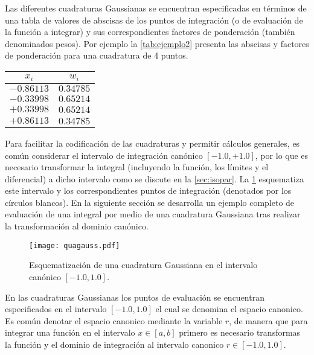 Las diferentes cuadraturas Gaussianas se encuentran especificadas en 
términos de una tabla de valores de abscisas de los puntos de integración (o de 
evaluación de la función a integrar) y sus correspondientes factores de 
ponderación (también denominados pesos). Por ejemplo la \cref{tab:ejemplo2} 
presenta las abscisas y factores de ponderación para una cuadratura de 4 puntos.
\begin{center}
\begin{tabular}{cc}
  \hline
  $x_i$ & $w_i$ \\
  \hline 
  $-0.86113$  & $0.34785$  \\
  $-0.33998$  & $0.65214$  \\
  $ +0.33998$  & $0.65214$  \\
  $ +0.86113$  & $0.34785$  \\
  \hline
\end{tabular}
\label{tab:ejemplo2}
\end{center}

Para facilitar la codificación de las cuadraturas y permitir cálculos 
generales, es común considerar el intervalo de integración canónico 
$[-1.0,+1.0]$, por lo que es necesario transformar la integral (incluyendo la 
función, los límites y el diferencial) a dicho intervalo como se 
discute en la \cref{sec:isopar}. La \cref{fig:quagauss} esquematiza este 
intervalo y los correspondientes puntos de integración (denotados por los 
círculos blancos). En la siguiente sección se desarrolla un ejemplo completo de 
evaluación de una integral por medio de una cuadratura Gaussiana tras realizar 
la transformación al dominio canónico.
\begin{figure}[H]
\centering
\texttt{[image: quagauss.pdf]}
\caption{Esquematización de una cuadratura Gaussiana en el intervalo canónico 
$[-1.0,1.0]$.}
\label{fig:quagauss}
\end{figure}


\begin{tcolorbox}
En las cuadraturas Gaussianas los puntos de evaluación se encuentran especificados en el intervalo $[-1.0 , 1.0]$ el cual se denomina el espacio canonico. Es común denotar el espacio canonico mediante la variable $r$, de manera que para integrar una función en el intervalo $x \in [a , b]$ primero es necesario transformas la función y el dominio de integración al intervalo canonico $r \in [-1.0, 1.0].$
\end{tcolorbox}


